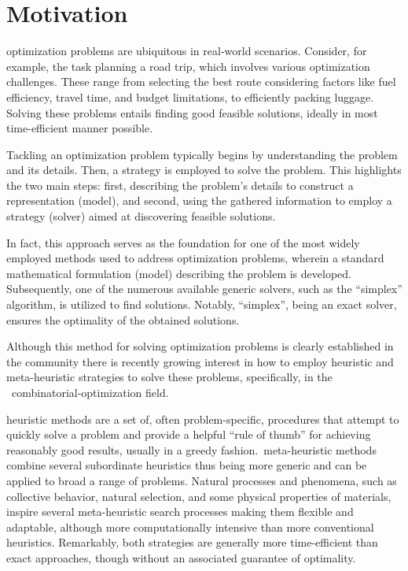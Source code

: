 \section{Motivation}
\label{sec:motivation}

\acrfull{optimization} problems are ubiquitous in real-world scenarios. Consider, for
example, the task planning a road trip, which involves various optimization
challenges. These range from selecting the best route considering factors like
fuel efficiency, travel time, and budget limitations, to efficiently packing
luggage. Solving these problems entails finding good feasible solutions, ideally
in most time-efficient manner possible.

Tackling an optimization problem typically begins by understanding the problem
and its details. Then, a strategy is employed to solve the problem. This
highlights the two main steps: first, describing the problem's details to
construct a representation (model), and second, using the gathered information
to employ a strategy (solver) aimed at discovering feasible solutions.

In fact, this approach serves as the foundation for one of the most widely
employed methods used to address optimization problems, wherein a standard
mathematical formulation (model) describing the problem is developed.
Subsequently, one of the numerous available generic solvers, such as the
``simplex'' algorithm, is utilized to find solutions. Notably, ``simplex'',
being an exact solver, ensures the optimality of the obtained solutions.

Although this method for solving optimization problems is clearly established in
the community there is recently growing interest in how to employ heuristic and
meta-heuristic strategies to solve these problems, specifically, in the
~\acrfull{combinatorial-optimization} field.

\acrfull{heuristic} methods are a set of, often problem-specific, procedures
that attempt to quickly solve a problem and provide a helpful ``rule of thumb''
for achieving reasonably good results, usually in a greedy fashion.~\acrfull{meta-heuristic} methods combine several subordinate heuristics thus
being more generic and can be applied to broad a range of problems. Natural
processes and phenomena, such as collective behavior, natural selection, and
some physical properties of materials, inspire several meta-heuristic search
processes making them flexible and adaptable, although more computationally
intensive than more conventional heuristics. Remarkably, both strategies are
generally more time-efficient than exact approaches, though without an
associated guarantee of optimality.

